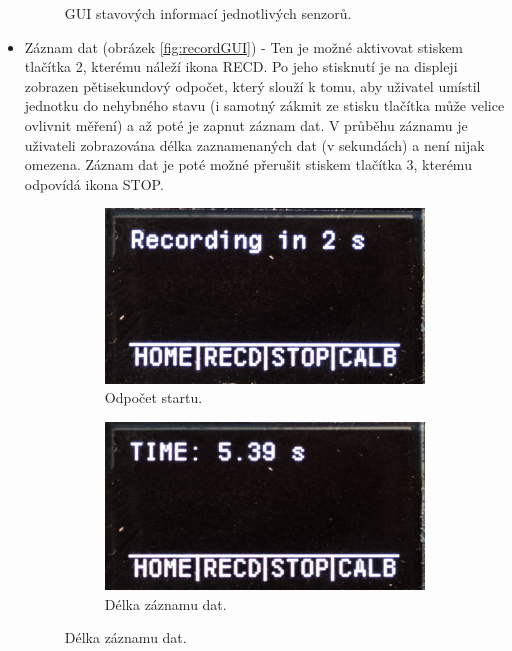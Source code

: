 \begin{itemize}
\begin{figure}[h]
\begin{subfigure}[b]{0.29\textwidth}
     \end{subfigure}

        \caption{GUI stavových informací jednotlivých senzorů.}
        \label{fig:stateInfoGUI}
\end{figure}

\item Záznam dat (obrázek \ref{fig:recordGUI}) - Ten je možné aktivovat stiskem tlačítka 2, kterému náleží ikona RECD. Po jeho stisknutí je na displeji zobrazen pětisekundový odpočet, který slouží k tomu, aby uživatel umístil jednotku do nehybného stavu (i samotný zákmit ze stisku tlačítka může velice ovlivnit měření) a až poté je zapnut záznam dat. V průběhu záznamu je uživateli zobrazována délka zaznamenaných dat (v sekundách) a není nijak omezena. Záznam dat je poté možné přerušit stiskem tlačítka 3, kterému odpovídá ikona STOP.

\begin{figure}[h]
     \centering
     \begin{subfigure}[b]{0.29\textwidth}
         \centering
         \includegraphics[width=\textwidth]{obrazky/menuREC1}
         \caption{Odpočet startu.}     
     \end{subfigure}
     \hfill
     \centering
     \begin{subfigure}[b]{0.29\textwidth}
         \centering
         \includegraphics[width=\textwidth]{obrazky/menuREC2}
         \caption{Délka záznamu dat.}   
     \end{subfigure}


\end{figure}
\end{itemize}
